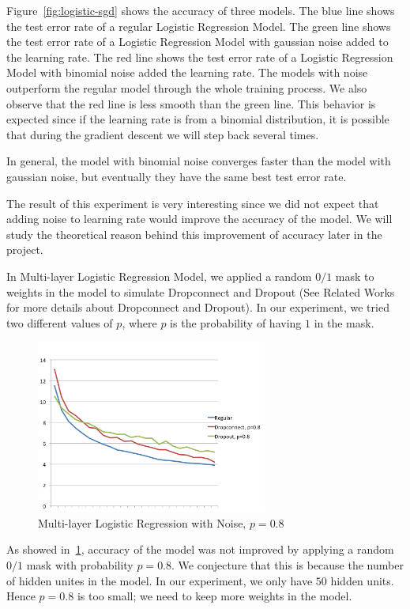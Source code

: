 Figure~\ref{fig:logistic-sgd} shows the accuracy of three models.
The blue line shows the test error rate of a regular Logistic Regression
Model.  The green line shows the test error rate of a Logistic Regression
Model with gaussian noise added to the learning rate.  The red line shows
the test error rate of a Logistic Regression Model with binomial noise
added the learning rate.  The models with noise outperform the regular
model through the whole training process.  We also observe that the red
line is less smooth than the green line.  This behavior is expected since
if the learning rate is from a binomial distribution, it is possible that
during the gradient descent we will step back several times.

In general, the model with binomial noise converges faster than the model
with gaussian noise, but eventually they have the same best test error
rate.

The result of this experiment is very interesting since we did not
expect that adding noise to learning rate would improve the accuracy
of the model. We will study the theoretical reason behind this improvement
of accuracy later in the project.

In Multi-layer Logistic Regression Model, we applied a random $0/1$ mask to
weights in the model to simulate Dropconnect and Dropout
(See Related Works for more details about Dropconnect and Dropout).
In our experiment, we tried two different values of $p$, where $p$ is
the probability of having $1$ in the mask.

\begin{figure}[h]
\centering
\includegraphics[width=215pt]{figs/mlp_psmall.png}
\caption{Multi-layer Logistic Regression with Noise, $p=0.8$}
\label{fig:mlp-noise-psmall}
\end{figure}

As showed in~\ref{fig:mlp-noise-psmall}, accuracy of the model was not
improved by applying a random $0/1$ mask with probability $p=0.8$.
We conjecture that this is because the number of hidden unites in the
model. In our experiment, we only have $50$ hidden units. Hence $p=0.8$ is
too small; we need to keep more weights in the model.

